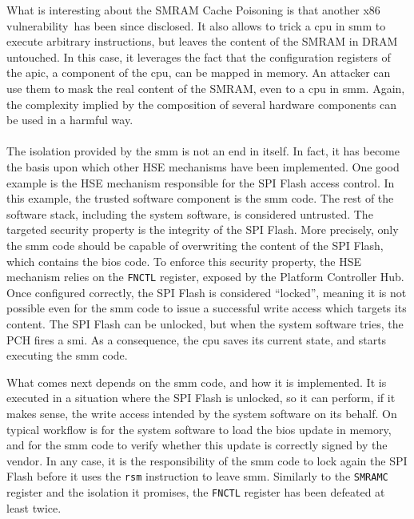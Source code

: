 What is interesting about the SMRAM Cache Poisoning is that another x86
vulnerability\,\cite{domas2015sinkhole} has been since disclosed.
%
It also allows to trick a \ac{cpu} in \ac{smm} to execute arbitrary
instructions, but leaves the content of the SMRAM in DRAM untouched.
%
In this case, it leverages the fact that the configuration registers of the
\ac{apic}, a component of the \ac{cpu}, can be mapped in memory.
%
An attacker can use them to mask the real content of the SMRAM, even to a
\ac{cpu} in \ac{smm}.
%
Again, the complexity implied by the composition of several hardware components
can be used in a harmful way.


\paragraph{}
%
The isolation provided by the \ac{smm} is not an end in itself.
%
In fact, it has become the basis upon which other HSE mechanisms have been
implemented.
%
One good example is the HSE mechanism responsible for the SPI Flash access
control.
%
In this example, the trusted software component is the \ac{smm} code.
%
The rest of the software stack, including the system software, is considered
untrusted.
%
The targeted security property is the integrity of the SPI Flash.
%
More precisely, only the \ac{smm} code should be capable of overwriting the content
of the SPI Flash, which contains the \ac{bios} code.
%
To enforce this security property, the HSE mechanism relies on the
\texttt{FNCTL}  register,
exposed by the Platform Controller Hub.
%
Once configured correctly, the SPI Flash is considered ``locked'', meaning it is
not possible even for the \ac{smm} code to issue a successful write access which
targets its content.
%
The SPI Flash can be unlocked, but when the system software tries, the PCH fires
a \ac{smi}.
%
As a consequence, the \ac{cpu} saves its current state, and starts executing the \ac{smm}
code.

What comes next depends on the \ac{smm} code, and how it is implemented.
%
It is executed in a situation where the SPI Flash is unlocked, so it can
perform, if it makes sense, the write access intended by the system software on
its behalf.
%
On typical workflow is for the system software to load the \ac{bios} update in
memory, and for the \ac{smm} code to verify whether this update is correctly signed
by the vendor.
%
In any case, it is the responsibility of the \ac{smm} code to lock again the SPI
Flash before it uses the \texttt{rsm} instruction to leave \ac{smm}.
%
Similarly to the \texttt{SMRAMC} register and the isolation it promises, the
\texttt{FNCTL} register has been defeated at least twice.

